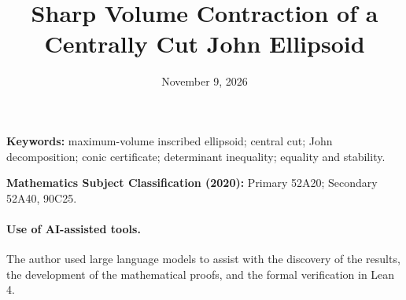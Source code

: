 \documentclass[11pt,a4paper]{article}
\title{Sharp Volume Contraction of a Centrally Cut John Ellipsoid}
\author{\paperauthors}
\date{November 9, 2026}
\numberwithin{equation}{section}
\begin{document}
\maketitle
\begin{abstract}

\end{abstract}
\noindent\textbf{Keywords:} maximum-volume inscribed ellipsoid;
central cut; John decomposition; conic certificate; determinant inequality;
equality and stability.

\smallskip
\noindent\textbf{Mathematics Subject Classification (2020):}
Primary 52A20; Secondary 52A40, 90C25.













\paragraph{Use of AI-assisted tools.}
The author used large language models to assist with the discovery of the
results, the development of the mathematical proofs, and the formal
verification in Lean 4.

\clearpage


\end{document}
